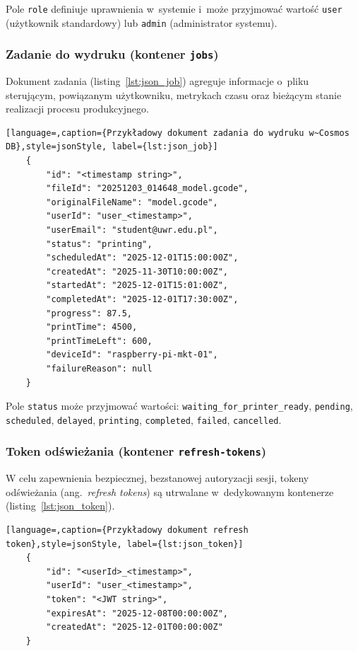 \documentclass[a4paper,12pt,reqno]{article}
\begin{document}
Pole \texttt{role} definiuje uprawnienia w~systemie i~może przyjmować wartość \texttt{user} (użytkownik standardowy) lub \texttt{admin} (administrator systemu).

\subsubsection{Zadanie do wydruku (kontener \texttt{jobs})}

Dokument zadania (listing~\ref{lst:json_job}) agreguje informacje o~pliku sterującym, powiązanym użytkowniku, metrykach czasu oraz bieżącym stanie realizacji procesu produkcyjnego.

\begin{lstlisting}[language=,caption={Przykładowy dokument zadania do wydruku w~Cosmos DB},style=jsonStyle, label={lst:json_job}]
	{
		"id": "<timestamp string>",
		"fileId": "20251203_014648_model.gcode",
		"originalFileName": "model.gcode",
		"userId": "user_<timestamp>",
		"userEmail": "student@uwr.edu.pl",
		"status": "printing",
		"scheduledAt": "2025-12-01T15:00:00Z",
		"createdAt": "2025-11-30T10:00:00Z",
		"startedAt": "2025-12-01T15:01:00Z",
		"completedAt": "2025-12-01T17:30:00Z",
		"progress": 87.5,
		"printTime": 4500,
		"printTimeLeft": 600,
		"deviceId": "raspberry-pi-mkt-01",
		"failureReason": null
	}
\end{lstlisting}

Pole \texttt{status} może przyjmować wartości:
\texttt{waiting\_for\_printer\_ready}, \texttt{pending}, \texttt{scheduled},
\texttt{delayed}, \texttt{printing},
\texttt{completed}, \texttt{failed},
\texttt{cancelled}.

\subsubsection{Token odświeżania (kontener \texttt{refresh-tokens})}

W celu zapewnienia bezpiecznej, bezstanowej autoryzacji sesji, tokeny odświeżania (ang.~\textit{refresh tokens}) są utrwalane w~dedykowanym kontenerze (listing~\ref{lst:json_token}).

\begin{lstlisting}[language=,caption={Przykładowy dokument refresh token},style=jsonStyle, label={lst:json_token}]
	{
		"id": "<userId>_<timestamp>",
		"userId": "user_<timestamp>",
		"token": "<JWT string>",
		"expiresAt": "2025-12-08T00:00:00Z",
		"createdAt": "2025-12-01T00:00:00Z"
	}
\end{lstlisting}
\end{document}
